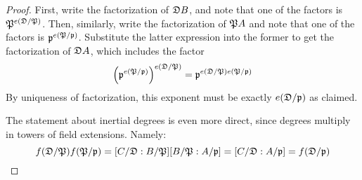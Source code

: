 \begin{proof}
	First, write the factorization of $\mathfrak{D} B$, and note that one of the factors is $\mathfrak{P}^{e(\mathfrak{D}/\mathfrak{P})}$. Then, similarly, write the factorization of $\mathfrak{P} A$ and note that one of the factors is $\mathfrak{p}^{e(\mathfrak{P}/\mathfrak{p})}$. Substitute the latter expression into the former to get the factorization of $\mathfrak{D} A$, which includes the factor
	\[ \left(\mathfrak{p}^{e(\mathfrak{P}/\mathfrak{p})}\right)^{e(\mathfrak{D}/\mathfrak{P})} = \mathfrak{p}^{e(\mathfrak{D}/\mathfrak{P})e(\mathfrak{P}/\mathfrak{p})} \]
	By uniqueness of factorization, this exponent must be exactly $e(\mathfrak{D}/\mathfrak{p})$ as claimed.
	
	The statement about inertial degrees is even more direct, since degrees multiply in towers of field extensions. Namely:
	\[ f(\mathfrak{D}/\mathfrak{P})f(\mathfrak{P}/\mathfrak{p}) = [C/\mathfrak{D}:B/\mathfrak{P}][B/\mathfrak{P}:A/\mathfrak{p}] = [C/\mathfrak{D}:A/\mathfrak{p}] = f(\mathfrak{D}/\mathfrak{p}) \]
\end{proof}
